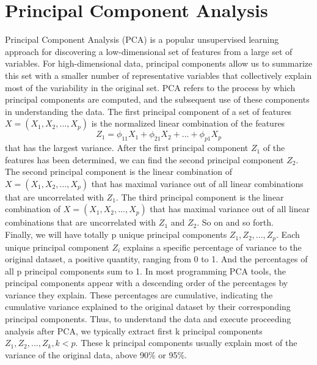 \documentclass[12pt]{report} %
\begin{document}
\section{Principal Component Analysis}
Principal Component Analysis (PCA) is a popular unsupervised learning approach for discovering a low-dimensional set of features from a large set of variables. For high-dimensional data, principal components allow us to summarize this set with a smaller number of representative variables that collectively explain most of the variability in the original set. PCA refers to the process by which principal components are computed, and the subsequent use of these components in understanding the data. The first principal component of a set of features \(X = (X_{1}, X_{2},..., X_{p})\) is the normalized linear combination of the features
\begin{equation}
Z_{1} = \phi_{11}X_{1} + \phi_{21}X_{2} +...+ \phi_{p1}X_{p}
\end{equation}
that has the largest variance. After the first principal component \(Z_{1}\) of the features has been determined, we can find the second principal component \(Z_{2}\). The second principal component is the linear combination of \(X = (X_{1}, X_{2},..., X_{p})\) that has maximal variance out of all linear combinations that are uncorrelated with \(Z_{1}\). The third principal component is the linear combination of \(X = (X_{1}, X_{2},..., X_{p})\) that has maximal variance out of all linear combinations that are uncorrelated with \(Z_{1}\) and \(Z_{2}\). So on and so forth\cite{STAT}. \\
Finally, we will have totally p unique principal components \(Z_{1}, Z_{2},..., Z_{p}\). Each unique principal component \(Z_{i}\) explains a specific percentage of variance to the original dataset, a positive quantity, ranging from 0 to 1. And the percentages of all p principal components sum to 1. In most programming PCA tools, the principal components appear with a descending order of the percentages by variance they explain. These percentages are cumulative, indicating the cumulative variance explained to the original dataset by their corresponding principal components. Thus, to understand the data and execute proceeding analysis after PCA, we typically extract first k principal components \(Z_{1}, Z_{2},..., Z_{k}, k <p \). These k principal components usually explain most of the variance of the original data, above 90\% or 95\%.
\end{document}
